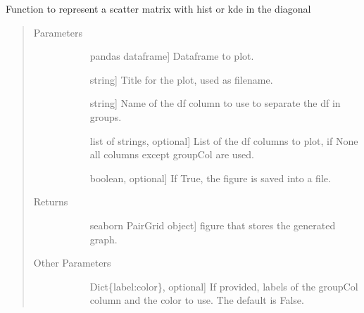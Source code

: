 \documentclass[letterpaper,10pt,english]{sphinxmanual}
\begin{document}
\begin{fulllineitems}
\label{\detokenize{rstFiles/scatterPlotMatrix:scatterPlotMatrix.scatterMatrix}}
Function to represent a scatter matrix with hist or kde in the diagonal
\begin{quote}\begin{description}
\item[{Parameters}] \leavevmode\begin{description}
\item[{}] \leavevmode{[}pandas dataframe{]}
Dataframe to plot.

\item[{}] \leavevmode{[}string{]}
Title for the plot, used as filename.

\item[{}] \leavevmode{[}string{]}
Name of the df column to use to separate the df in groups.

\item[{}] \leavevmode{[}list of strings, optional{]}
List of the df columns to plot, 
if None all columns except groupCol are used.

\item[{}] \leavevmode{[}boolean, optional{]}
If True, the figure is saved into a file.

\end{description}

\item[{Returns}] \leavevmode\begin{description}
\item[{}] \leavevmode{[}seaborn PairGrid object{]}
figure that stores the generated graph.

\end{description}

\item[{Other Parameters}] \leavevmode\begin{description}
\item[{}] \leavevmode{[}Dict\{label:color\}, optional{]}
If provided, labels of the groupCol column and the color to use. 
The default is False.


\end{description}
\end{description}
\end{quote}
\end{fulllineitems}
\end{document}
